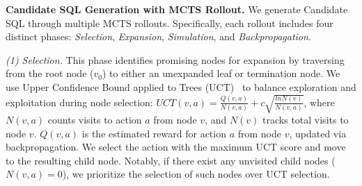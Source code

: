\textbf{Candidate SQL Generation with MCTS Rollout.}
We generate Candidate SQL through multiple MCTS rollouts. Specifically, each rollout includes four distinct phases: \textit{Selection}, \textit{Expansion}, \textit{Simulation}, and \textit{Backpropagation}.

\textit{(1) Selection.}
This phase identifies promising nodes for expansion by traversing from the root node ($v_0$) to either an unexpanded leaf or termination node. We use Upper Confidence Bound applied to Trees (UCT)~\cite{uct} to balance exploration and exploitation during node selection:
$ UCT(v, a) = \frac{Q(v,a)}{N(v,a)} + c \sqrt{\frac{lnN(v)}{N(v,a)}}$, 
where $N(v,a)$ counts visits to action $a$ from node $v$, and $N(v)$ tracks total visits to node $v$. $Q(v,a)$ is the estimated reward for action $a$ from node $v$, updated via backpropagation. We select the action with the maximum UCT score and move to the resulting child node.
Notably, if there exist any unvisited child nodes (\ie $N(v, a) = 0$), we prioritize the selection of such nodes over UCT selection.

